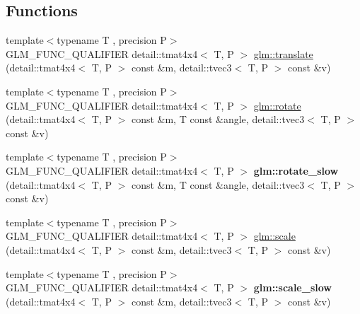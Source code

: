 \subsection*{Functions}
\begin{DoxyCompactItemize}
\item 
{\footnotesize template$<$typename T , precision P$>$ }\\G\+L\+M\+\_\+\+F\+U\+N\+C\+\_\+\+Q\+U\+A\+L\+I\+F\+I\+ER detail\+::tmat4x4$<$ T, P $>$ \hyperlink{group__gtc__matrix__transform_ga1501de0fa580dcc491b67e0685bbc7c2}{glm\+::translate} (detail\+::tmat4x4$<$ T, P $>$ const \&m, detail\+::tvec3$<$ T, P $>$ const \&v)
\item 
{\footnotesize template$<$typename T , precision P$>$ }\\G\+L\+M\+\_\+\+F\+U\+N\+C\+\_\+\+Q\+U\+A\+L\+I\+F\+I\+ER detail\+::tmat4x4$<$ T, P $>$ \hyperlink{group__gtc__matrix__transform_ga61e65a3bb227c267d1a15113d1056fb1}{glm\+::rotate} (detail\+::tmat4x4$<$ T, P $>$ const \&m, T const \&angle, detail\+::tvec3$<$ T, P $>$ const \&v)
\item 
{\footnotesize template$<$typename T , precision P$>$ }\\G\+L\+M\+\_\+\+F\+U\+N\+C\+\_\+\+Q\+U\+A\+L\+I\+F\+I\+ER detail\+::tmat4x4$<$ T, P $>$ {\bfseries glm\+::rotate\+\_\+slow} (detail\+::tmat4x4$<$ T, P $>$ const \&m, T const \&angle, detail\+::tvec3$<$ T, P $>$ const \&v)\hypertarget{namespaceglm_a03bd2c89f62ae44ad3a5e5dc21effd06}{}\label{namespaceglm_a03bd2c89f62ae44ad3a5e5dc21effd06}

\item 
{\footnotesize template$<$typename T , precision P$>$ }\\G\+L\+M\+\_\+\+F\+U\+N\+C\+\_\+\+Q\+U\+A\+L\+I\+F\+I\+ER detail\+::tmat4x4$<$ T, P $>$ \hyperlink{group__gtc__matrix__transform_gabd40959f269abd16c256a4f59ab03d62}{glm\+::scale} (detail\+::tmat4x4$<$ T, P $>$ const \&m, detail\+::tvec3$<$ T, P $>$ const \&v)
\item 
{\footnotesize template$<$typename T , precision P$>$ }\\G\+L\+M\+\_\+\+F\+U\+N\+C\+\_\+\+Q\+U\+A\+L\+I\+F\+I\+ER detail\+::tmat4x4$<$ T, P $>$ {\bfseries glm\+::scale\+\_\+slow} (detail\+::tmat4x4$<$ T, P $>$ const \&m, detail\+::tvec3$<$ T, P $>$ const \&v)\hypertarget{namespaceglm_aa836cb5d035a8b96e5e9b4bb5dce0ab2}{}\label{namespaceglm_aa836cb5d035a8b96e5e9b4bb5dce0ab2}


\end{DoxyCompactItemize}
